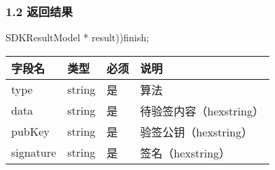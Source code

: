 \documentclass[letterpaper,10pt,english]{sphinxmanual}
\begin{document}
\subsubsection{1.2 返回结果}
\label{\detokenize{BCBWalletSDK_u63a5_u53e3_u8bf4_u660e:id109}}

\begin{sphinxVerbatim}[commandchars=\\\{\}]
     
     
\end{sphinxVerbatim}


\begin{sphinxVerbatim}[commandchars=\\\{\}]
     
\end{sphinxVerbatim}

SDKResultModel * result))finish;



\begin{savenotes}\sphinxattablestart
\centering
\begin{tabulary}{\linewidth}[t]{|T|T|T|T|}
\hline
\sphinxstyletheadfamily 
字段名
&\sphinxstyletheadfamily 
类型
&\sphinxstyletheadfamily 
必须
&\sphinxstyletheadfamily 
说明
\\
\hline
type
&
string
&
是
&
算法
\\
\hline
data
&
string
&
是
&
待验签内容（hexstring）
\\
\hline
pubKey
&
string
&
是
&
验签公钥（hexstring）
\\
\hline
signature
&
string
&
是
&
签名（hexstring）
\\
\hline
\end{tabulary}
\par
\sphinxattableend\end{savenotes}
\end{document}
